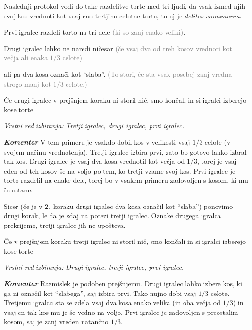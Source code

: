 \documentclass[a4paper,12pt]{article}
\begin{document}
Naslednji protokol vodi do take razdelitve torte med tri ljudi, da vsak izmed njih svoj kos vrednoti kot vsaj eno tretjino celotne torte, torej je {\em delitev sorazmerna}.


\begin{protokol}

\item Prvi igralec razdeli torto na tri dele \textcolor{gray}{(ki so zanj enako veliki)}.

\item Drugi igralec lahko ne naredi ničesar \textcolor{gray}{(če vsaj dva od treh kosov vrednoti kot večja ali enaka $1/3$ celote)}

ali pa dva kosa označi kot ``slaba''. \textcolor{gray}{(To stori, če sta vsak posebej zanj vredna strogo manj kot $1/3$ celote.)}

\item Če drugi igralec v prejšnjem koraku ni storil nič, smo končali in si igralci izberejo kose torte.

\textsl{Vrstni red izbiranja: Tretji igralec, drugi igralec, prvi igralec.}

\item [\textbf { \em Komentar}] V tem primeru je vsakdo dobil kos v velikosti vsaj  $1/3$ celote (v svojem načinu vrednotenja). Tretji igralec izbira prvi, zato bo gotovo lahko izbral tak kos. Drugi igralec je vsaj dva kosa vrednotil kot večja od  $1/3$, torej je vsaj eden od teh kosov še na voljo po tem, ko tretji vzame svoj kos. Prvi igralec je torto razdelil na enake dele, torej bo v vsakem primeru zadovoljen s kosom, ki mu še ostane.

\item Sicer (če je v 2.~koraku drugi igralec dva kosa označil kot ``slaba'') ponovimo drugi korak, le da je zdaj na potezi tretji igralec. Oznake drugega igralca prekrijemo, tretji igralec jih ne upošteva.

\item Če v prejšnjem koraku tretji igralec ni storil nič, smo končali in si igralci izberejo kose torte.

\textsl{Vrstni red izbiranja: Drugi igralec, tretji igralec, prvi igralec.}

\item [\textbf{\em Komentar}] Razmislek je podoben prejšnjemu. Drugi igralec lahko izbere kos, ki ga ni označil kot ``slabega'', saj izbira prvi. Tako nujno dobi vsaj $1/3$ celote. Tretjemu igralcu sta se zdela vsaj dva kosa enako velika (in oba večja od $1/3$) in vsaj en tak kos mu je še vedno na voljo. Prvi igralec je zadovoljen s preostalim kosom, saj je zanj vreden natančno $1/3$.


\end{protokol}
\end{document}
